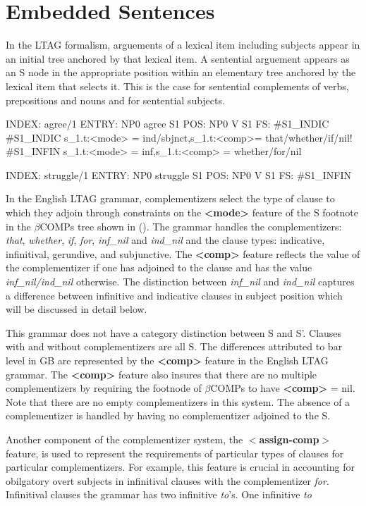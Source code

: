 \section{Embedded Sentences}
In the LTAG formalism,  arguements of a lexical item including
subjects appear in an initial tree anchored by that lexical item.  A
sentential arguement appears  as an S node in the appropriate
position within an elementary tree anchored by the lexical item that
selects it. This is the case for  
sentential complements of verbs, prepositions and nouns and for
sentential subjects. 


INDEX:  agree/1
ENTRY:  NP0 agree S1
POS:    NP0 V S1
FS:     #S1_INDIC
#S1_INDIC       s_1.t:<mode> = ind/sbjnct,s_1.t:<comp>= that/whether/if/nil!
#S1_INFIN       s_1.t:<mode> = inf,s_1.t:<comp> = whether/for/nil

INDEX:  struggle/1
ENTRY:  NP0 struggle S1
POS:    NP0 V S1
FS:     #S1_INFIN

In the English LTAG grammar, complementizers select the type of clause
to which they adjoin through constraints on the {\bf <mode>} feature
of the S footnote in the $\beta$COMPs tree shown in ().  The grammar
handles the complementizers: {\it that\/}, {\it whether\/}, {\it
if\/}, {\it for\/}, {\it inf_nil} and {\it ind_nil} and the clause types: indicative,
infinitival, gerundive, and subjunctive.  The  {\bf
<comp>} feature reflects the value of the complementizer if one has
adjoined to the clause and has the value {\it inf_nil/ind_nil}
otherwise. The distinction between {\it inf_nil} and {\it ind_nil}
captures a difference between infinitive and indicative clauses in
subject position which will be discussed in detail below.  

This grammar
does not have a category distinction between S and S'. Clauses with
and without complementizers are all S. The differences attributed to
bar level in GB are represented by the {\bf <comp>} feature in the
English LTAG grammar.  The {\bf <comp>} feature also insures that
there are no multiple complementizers by requiring the footnode of
$\beta$COMPs to have {\bf <comp>} = nil.  Note that there are no empty
complementizers in this system. The absence of a complementizer is
handled by having no complementizer adjoined to the S.

Another component of the complementizer system, the {\bf
$<$assign-comp$>$} feature, is used to represent the requirements of
particular types of clauses for particular complementizers.  For
example, this feature is crucial in accounting for obilgatory overt
subjects in infinitival clauses with the complementizer {\it for}.
Infinitival clauses  the grammar has two infinitive {\it to}'s. One infinitive
{\it to\/} 

